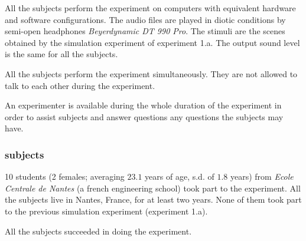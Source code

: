 \documentclass[12pt]{elsarticle}
\begin{document}

All the subjects perform the experiment on computers with equivalent hardware and software configurations. The audio files are played in diotic conditions by semi-open headphones \emph{Beyerdynamic DT 990 Pro}. The stimuli are the scenes obtained by the simulation experiment of experiment 1.a. The output sound level is the same for all the subjects.


All the subjects perform the experiment simultaneously. They are not allowed to talk to each other during the experiment.


An experimenter is available during the whole duration of the experiment in order to assist subjects and answer questions any questions the subjects may have.

\subsubsection*{subjects}


10 students (2 females; averaging $23.1$ years of age, s.d. of $1.8$ years) from \emph{Ecole Centrale de Nantes} (a french engineering school) took part to the experiment. All the subjects live in Nantes, France, for at least two years. None of them took part to the previous simulation experiment (experiment 1.a).


All the subjects succeeded in doing the experiment.
\end{document}
